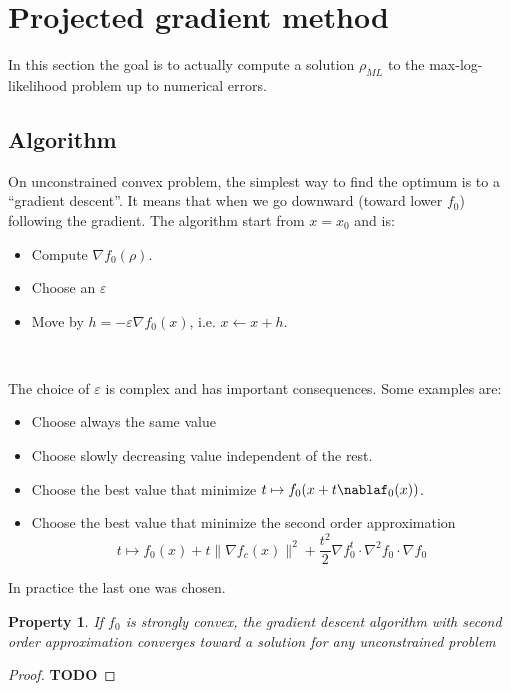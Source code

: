 \documentclass[10pt]{report}
\theoremstyle{plain}
\newtheorem{prop}[thm]{Property}
\theoremstyle{definition}
\theoremstyle{remark}
\newcommand{\TODO}{\textbf{TODO}}
\newcommand{\ml}{_{M\!L}}
\begin{document}
\section{Projected gradient method}

In this section the goal is to actually compute a solution $\rho\ml$ to the
max-log-likelihood problem up to
numerical errors.

\subsection{Algorithm}

On unconstrained convex problem, the simplest way to find the optimum is to a
``gradient descent''. It means that when we go downward (toward lower $f_0$)
following the gradient. The algorithm start from $x = x_0$ and is:

\begin{itemize}
\item Compute $\nabla f_0(\rho)$.
\item Choose an $\varepsilon$
\item Move by $h = -\varepsilon \nabla f_0(x)$, i.e. $x \leftarrow x + h$.
\end{itemize}

\

\noindent The choice of $\varepsilon$ is complex and has important consequences.
Some examples are:
\begin{itemize}
\item Choose always the same value
\item Choose slowly decreasing value independent of the rest.
\item Choose the best value that minimize $t \mapsto f_0(x + t\nablaf_0(x))$.
\item Choose the best value that minimize the second order approximation
  \[t \mapsto f_0(x) + t\|\nabla f_c(x)\|^2 + \frac {t^2} 2 \nabla f_0^t \cdot
  \nabla^2\!f_0 \cdot \nabla f_0\]
\end{itemize}

In practice the last one was chosen.
\begin{prop}
  If $f_0$ is strongly convex,
  the gradient descent algorithm with second order approximation converges
  toward a solution for any unconstrained problem
\end{prop}

\begin{proof}
  \TODO{}
\end{proof}
\end{document}
